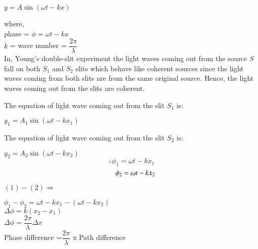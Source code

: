 \documentclass[journal,12pt,twocolumn]{IEEEtran}
\theoremstyle{remark}
\begin{document}
  \hspace*{1.3cm}  $y = A\sin{(\omega t - kx)}$

\vspace{0.3cm}

 where,\\
 \hspace*{1.5cm} phase = $\phi = \omega t - kx$ \\
 \hspace*{1.5cm} $k$ = wave number = $\dfrac{2\pi}{\lambda}$ \\
In, Young's double-slit experiment the light waves coming out from the source $S$ fall on both $S_1$ and $S_2$ slits which behave like coherent sources since the light waves coming from both slits are from the same original source. Hence, the light waves coming out from the slits are coherent.

\vspace{0.3cm}

The equation of light wave coming out from the slit $S_1$ is:

\vspace{0.2cm}

 \hspace*{1.3cm}  $y_1 = A_1\sin{(\omega t - kx_1)}$

 \vspace{0.3cm}

The equation of light wave coming out from the slit $S_2$ is:

\vspace{0.2cm}

 \hspace*{1.3cm}  $y_2 = A_2\sin{(\omega t - kx_2)}$
\hspace{0.3cm}
\begin{equation}
 \therefore \phi_1 = \omega t - kx_1 
\end{equation}
\begin{equation}
\hspace*{0.4cm} \phi_2 = \omega t - kx_2 
\end{equation}

$ (1) - (2)  \Rightarrow{}$

\hspace*{0.3cm}$\phi_1 - \phi_2 = \omega t - kx_1 -( \omega t - kx_2 )$ \\ 

\hspace{0.3cm}$ \Delta \phi = k(x_2 - x_1) $ \\

\hspace{0.3cm}$ \Delta \phi = \dfrac{2\pi}{\lambda}\Delta x$ \\ 
\hspace{0.3cm} Phase difference =$\dfrac{2\pi}{\lambda}$ x Path difference
\end{document}

